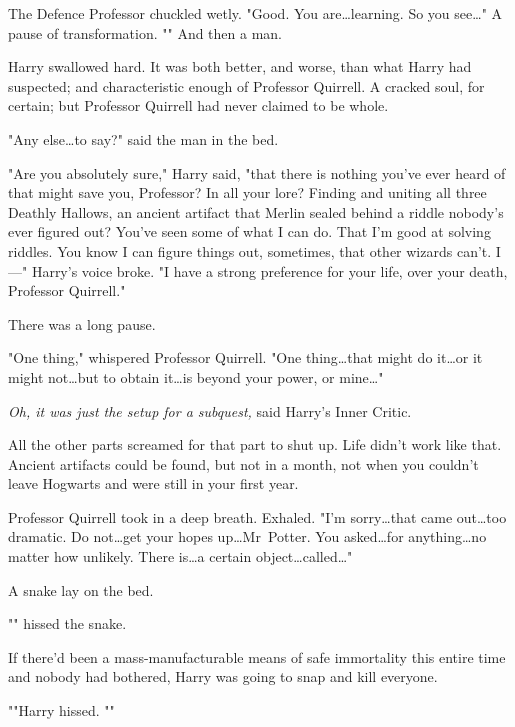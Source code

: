 The Defence Professor chuckled wetly. "Good. You are…learning. So you
see…" A pause of transformation. "" And then a man.

Harry swallowed hard. It was both better, and worse, than what Harry had
suspected; and characteristic enough of Professor Quirrell. A cracked soul, for
certain; but Professor Quirrell had never claimed to be whole.

"Any else…to say?" said the man in the bed.

"Are you absolutely sure," Harry said, "that there is nothing you've ever heard
of that might save you, Professor? In all your lore? Finding and uniting all
three Deathly Hallows, an ancient artifact that Merlin sealed behind a riddle
nobody's ever figured out? You've seen some of what I can do. That I'm good at
solving riddles. You know I can figure things out, sometimes, that other
wizards can't. I—" Harry's voice broke. "I have a strong preference for your
life, over your death, Professor Quirrell."

There was a long pause.

"One thing," whispered Professor Quirrell. "One thing…that might do
it…or it might not…but to obtain it…is beyond your
power, or mine…"

\emph{Oh, it was just the setup for a subquest,} said Harry's Inner Critic.

All the other parts screamed for that part to shut up. Life didn't work like
that. Ancient artifacts could be found, but not in a month, not when you
couldn't leave Hogwarts and were still in your first year.

Professor Quirrell took in a deep breath. Exhaled. "I'm sorry…that came
out…too dramatic. Do not…get your hopes up…Mr~Potter.
You asked…for anything…no matter how unlikely. There is…a
certain object…called…"

A snake lay on the bed.

"" hissed the snake.

If there'd been a mass-manufacturable means of safe immortality this entire
time and nobody had bothered, Harry was going to snap and kill everyone.

""Harry hissed. ""

